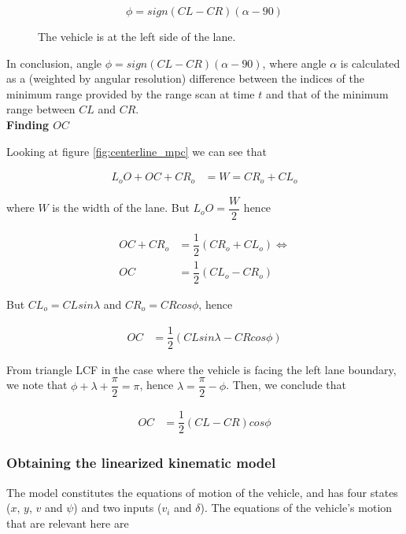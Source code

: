 $$\phi = sign(CL-CR)(\alpha - 90)$$

\begin{figure}[H]\centering
  \scalebox{1}{}
  \caption{The vehicle is at the left side of the lane.}
  \label{fig:circular_mpc_rotation_car_at_left_side}
\end{figure}


In conclusion, angle $\phi = sign(CL-CR) (\alpha-90)$, where angle $\alpha$
is calculated as a (weighted by angular resolution) difference between the
indices of the minimum range provided by the range scan at time $t$ and that
of the minimum range between $CL$ and $CR$. \\


\textbf{Finding $OC$}

Looking at figure \ref{fig:centerline_mpc} we can see that

\begin{align}
  L_o O + OC + CR_o &= W = CR_o + CL_o
\end{align}

where $W$ is the width of the lane. But $L_o O = \dfrac{W}{2}$ hence

\begin{align}
  OC + CR_o &= \dfrac{1}{2}(CR_o + CL_o) \Leftrightarrow \\
  OC &= \dfrac{1}{2}(CL_o - CR_o)
\end{align}

But $CL_o = CL sin\lambda$ and $CR_o = CR cos\phi$, hence


\begin{align}
  OC &= \dfrac{1}{2}(CL sin\lambda - CR cos\phi)
\end{align}

From triangle LCF in the case where the vehicle is facing the left lane boundary,
we note that $\phi + \lambda + \dfrac{\pi}{2} = \pi$,
hence $\lambda = \dfrac{\pi}{2} - \phi$. Then, we conclude that

\begin{align}
  OC &= \dfrac{1}{2}(CL - CR) cos\phi
\end{align}




\subsubsection{Obtaining the linearized kinematic model}

The model constitutes the equations of motion of the vehicle, and has four
states ($x$, $y$, $v$ and $\psi$) and two inputs ($v_i$ and $\delta$). The
equations of the vehicle's motion that are relevant here are

